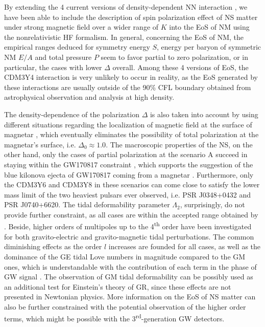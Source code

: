 By extending the 4 current versions of density-dependent \gls{NN} interaction \citep{tan2021equation}, we have been able to include the description of spin polarization effect of \gls{NS} matter under strong magnetic field over a wider range of $K$ into the \gls{EoS} of \gls{NM} using the nonrelativistic \gls{HF} formalism. In general, concerning the \gls{EoS} of \gls{NM}, the empirical ranges deduced for symmetry energy $S$, energy per baryon of symmetric \gls{NM} $E/A$ and total pressure $P$ seem to favor partial to zero polarization, or in particular, the cases with lower $\Delta$ overall. Among these 4 versions of \gls{EoS}, the CDM3Y4 interaction is very unlikely to occur in reality, as the \gls{EoS} generated by these interactions are usually outside of the 90\% \gls{CFL} boundary obtained from astrophysical observation and analysis at high density.

The density-dependence of the polarization $\Delta$ is also taken into account by using different situations regarding the localization of magnetic field at the surface of magnetar \citep{tan2020spin}, which eventually eliminates the possibility of total polarization at the magnetar's surface, i.e. $\Delta_0\approx 1.0$. The macroscopic properties of the \gls{NS}, on the other hand, only the cases of partial polarization at the scenario A succeed in staying within the GW170817 constraint \citep{abbott2018gw170817}, which supports the suggestion of the blue kilonova ejecta of GW170817 coming from a magnetar \citep{metzger2018magnetar,tan2020spin}. Furthermore, only the CDM3Y6 and CDM3Y8 in these scenarios can come close to satisfy the lower mass limit of the two heaviest pulsars ever observed, i.e. \gls{PSR} J0348+0432 and \gls{PSR} J0740+6620. The tidal deformability parameter $\Lambda_2$, surprisingly, do not provide further constraint, as all cases are within the accepted range obtained by \cite{abbott2018gw170817}. Beside, higher orders of multipoles up to the 4\textsuperscript{th} order have been investigated for both gravito-electric and gravito-magnetic tidal perturbations. The common diminishing effects as the order $l$ increases are founded for all cases, as well as the dominance of the \gls{GE} tidal Love numbers in magnitude compared to the \gls{GM} ones, which is understandable with the contribution of each term in the phase of \gls{GW} signal \citep{abdelsalhin2018post}. The observation of \gls{GM} tidal deformability can be possibly used as an additional test for Einstein's theory of \gls{GR}, since these effects are not presented in Newtonian physics. More information on the \gls{EoS} of \gls{NS} matter can also be further constrained with the potential observation of the higher order terms, which might be possible with the 3\textsuperscript{rd}-generation \gls{GW} detectors.

